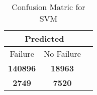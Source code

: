 \begin{table}[] 
\caption{Confusion Matric for SVM} 
\label{Table: Prediction Accuracy-NoneSVM75.0EKF-ignoreReflection-Reflection} 
\centering 
\begin{tabular} 
 {@{}ccc@{}} 
\toprule 
\multicolumn{2}{c}{\textbf{Predicted}}
 \\ \midrule 
\multicolumn{1}{|c|}{Failure} & 
\multicolumn{1}{c|}{No Failure}
 \\ \midrule 
\multicolumn{1}{|c|}{\color{green}\textbf{140896}} & 
\multicolumn{1}{c|}{\color{green}\textbf{18963}}
 \\ \midrule 
\multicolumn{1}{|c|}{\color{red}\textbf{2749}} & 
\multicolumn{1}{c|}{\color{red}\textbf{7520}}
 \\ \bottomrule 
\end{tabular} 
\end{table} 
